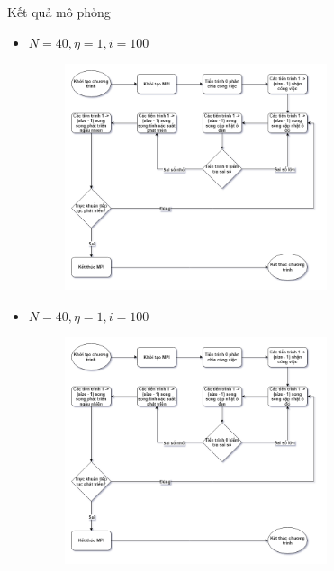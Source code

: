\begin{frame}[allowframebreaks]{Kết quả mô phỏng}
\begin{itemize}
\begin{figure}[H]
    \end{figure}
\end{itemize}
\break
\begin{itemize}
    \item $N = 40, \eta = 1, i = 100$
    \begin{figure}[H]
        \centering
        \includegraphics[width=77mm]{img/algo-flowchart.png}
    \end{figure}
\end{itemize}
\break
\begin{itemize}
    \item $N = 40, \eta = 1, i = 100$
    \begin{figure}[H]
        \centering
        \includegraphics[width=77mm]{img/algo-flowchart.png}
    \end{figure}
\end{itemize}
\break
\end{frame}